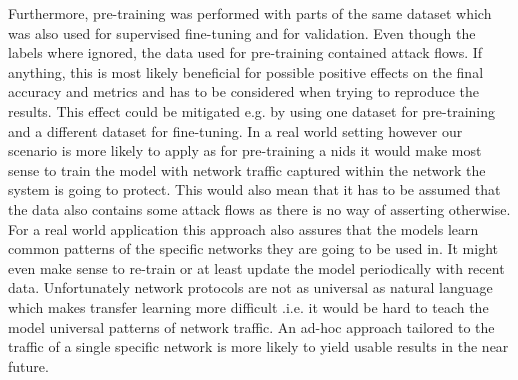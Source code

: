 Furthermore, pre-training was performed with parts of the same dataset which was also used for supervised fine-tuning and for validation. Even though the labels where ignored, the data used for pre-training contained attack flows. If anything, this is most likely beneficial for possible positive effects on the final accuracy and metrics and has to be considered when trying to reproduce the results. This effect could be mitigated e.g. by using one dataset for pre-training and a different dataset for fine-tuning. In a real world setting however our scenario is more likely to apply as for pre-training a \gls{nids} it would make most sense to train the model with network traffic captured within the network the system is going to protect. This would also mean that it has to be assumed that the data also contains some attack flows as there is no way of asserting otherwise. For a real world application this approach also assures that the models learn common patterns of the specific networks they are going to be used in. It might even make sense to re-train or at least update the model periodically with recent data. Unfortunately network protocols are not as universal as natural language which makes transfer learning more difficult .i.e. it would be hard to teach the model universal patterns of network traffic. An ad-hoc approach tailored to the traffic of a single specific network is more likely to yield usable results in the near future. \par

